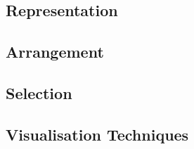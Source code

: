 \subsection{Representation}
\subsection{Arrangement}
\subsection{Selection}

\subsection{Visualisation Techniques}





